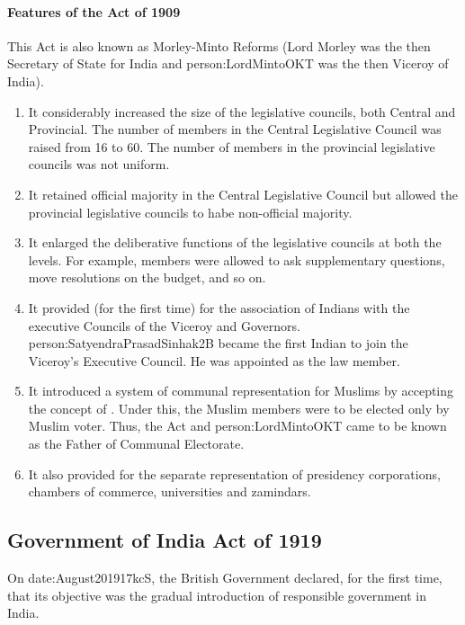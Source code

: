 \paragraph{Features of the Act of 1909}
This Act is also known as Morley-Minto Reforms (Lord Morley was the then Secretary of State for India and \gls{person:LordMintoOKT} was the then Viceroy of India).
\begin{enumerate}
  \item It considerably increased the size of the legislative councils, both Central and Provincial. The number of members in the Central Legislative Council was raised from 16 to 60. The number of members in the provincial legislative councils was not uniform.
  \item It retained official majority in the Central Legislative Council but allowed the provincial legislative councils to habe non-official majority.
  \item It enlarged the deliberative functions of the legislative councils at both the levels. For example, members were allowed to ask supplementary questions, move resolutions on the budget, and so on.
  \item It provided (for the first time) for the association of Indians with the executive Councils of the Viceroy and Governors. \gls{person:SatyendraPrasadSinhak2B} became the first Indian to join the Viceroy's Executive Council. He was appointed as the law member.
  \item It introduced a system of communal representation for Muslims by accepting the concept of . Under this, the Muslim members were to be elected only by Muslim voter. Thus, the Act  and \gls{person:LordMintoOKT} came to be known as the Father of Communal Electorate.
  \item It also provided for the separate representation of presidency corporations, chambers of commerce, universities and zamindars.
\end{enumerate}

\subsection{Government of India Act of 1919}

On \gls{date:August201917kcS}, the British Government declared, for the first time, that its objective was the gradual introduction of responsible government in India.

